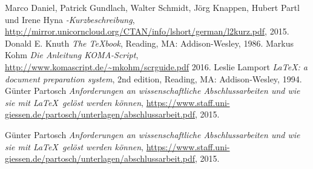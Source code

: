 \documentclass[11pt]{scrartcl}       %
\begin{document}
\begin{thebibliography}{99}                    %


	Marco Daniel, Patrick Gundlach, Walter Schmidt, Jörg Knappen, Hubert
	Partl und Irene Hyna
	\emph{\LaTeXe-Kurzbeschreibung},
	\url{http://mirror.unicorncloud.org/CTAN/info/lshort/german/l2kurz.pdf},
	2015.
	Donald E. Knuth
	\emph{The \TeX book},
  Reading, MA: Addison-Wesley,
	1986.
	Markus Kohm
	\emph{Die Anleitung \textsf{KOMA-Script}},
	\url{http://www.komascript.de/~mkohm/scrguide.pdf}
	2016.
  Leslie Lamport
  \emph{\LaTeX: a document preparation system},
  2nd edition,
  Reading, MA: Addison-Wesley,
  1994.
	Günter Partosch
	\emph{Anforderungen an wissenschaftliche Abschlussarbeiten und wie sie
	mit \LaTeX\ gelöst werden können},
	\url{https://www.staff.uni-giessen.de/partosch/unterlagen/abschlussarbeit.pdf},
	2015.
	
	Günter Partosch
	\emph{Anforderungen an wissenschaftliche Abschlussarbeiten und wie sie
	mit \LaTeX\ gelöst werden können},
	\url{https://www.staff.uni-giessen.de/partosch/unterlagen/abschlussarbeit.pdf},
	2015.

\end{thebibliography}
\end{document}
